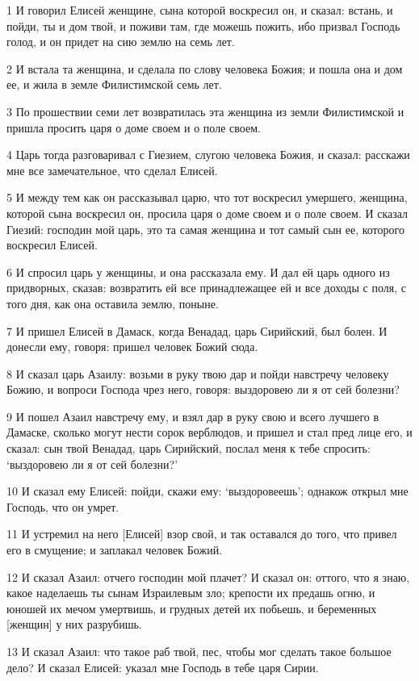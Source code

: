 \par 1 И говорил Елисей женщине, сына которой воскресил он, и сказал: встань, и пойди, ты и дом твой, и поживи там, где можешь пожить, ибо призвал Господь голод, и он придет на сию землю на семь лет.
\par 2 И встала та женщина, и сделала по слову человека Божия; и пошла она и дом ее, и жила в земле Филистимской семь лет.
\par 3 По прошествии семи лет возвратилась эта женщина из земли Филистимской и пришла просить царя о доме своем и о поле своем.
\par 4 Царь тогда разговаривал с Гиезием, слугою человека Божия, и сказал: расскажи мне все замечательное, что сделал Елисей.
\par 5 И между тем как он рассказывал царю, что тот воскресил умершего, женщина, которой сына воскресил он, просила царя о доме своем и о поле своем. И сказал Гиезий: господин мой царь, это та самая женщина и тот самый сын ее, которого воскресил Елисей.
\par 6 И спросил царь у женщины, и она рассказала ему. И дал ей царь одного из придворных, сказав: возвратить ей все принадлежащее ей и все доходы с поля, с того дня, как она оставила землю, поныне.
\par 7 И пришел Елисей в Дамаск, когда Венадад, царь Сирийский, был болен. И донесли ему, говоря: пришел человек Божий сюда.
\par 8 И сказал царь Азаилу: возьми в руку твою дар и пойди навстречу человеку Божию, и вопроси Господа чрез него, говоря: выздоровею ли я от сей болезни?
\par 9 И пошел Азаил навстречу ему, и взял дар в руку свою и всего лучшего в Дамаске, сколько могут нести сорок верблюдов, и пришел и стал пред лице его, и сказал: сын твой Венадад, царь Сирийский, послал меня к тебе спросить: `выздоровею ли я от сей болезни?'
\par 10 И сказал ему Елисей: пойди, скажи ему: `выздоровеешь'; однакож открыл мне Господь, что он умрет.
\par 11 И устремил на него [Елисей] взор свой, и так оставался до того, что привел его в смущение; и заплакал человек Божий.
\par 12 И сказал Азаил: отчего господин мой плачет? И сказал он: оттого, что я знаю, какое наделаешь ты сынам Израилевым зло; крепости их предашь огню, и юношей их мечом умертвишь, и грудных детей их побьешь, и беременных [женщин] у них разрубишь.
\par 13 И сказал Азаил: что такое раб твой, пес, чтобы мог сделать такое большое дело? И сказал Елисей: указал мне Господь в тебе царя Сирии.
